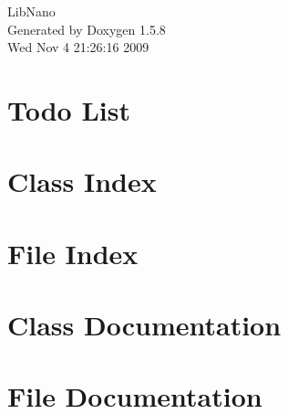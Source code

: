 \documentclass[a4paper]{book}
\begin{document}
\begin{titlepage}
\vspace*{7cm}
\begin{center}
{\Large LibNano }\\
\vspace*{1cm}
{\large Generated by Doxygen 1.5.8}\\
\vspace*{0.5cm}
{\small Wed Nov 4 21:26:16 2009}\\
\end{center}
\end{titlepage}
\clearemptydoublepage
{}
\tableofcontents
\clearemptydoublepage
{}
\chapter{Todo List}
\label{todo}
\hypertarget{todo}{}

\chapter{Class Index}

\chapter{File Index}

\chapter{Class Documentation}












\chapter{File Documentation}












\printindex
\end{document}
